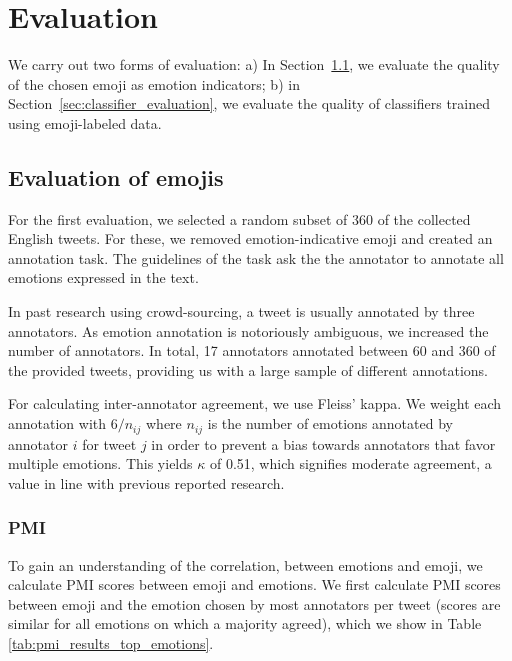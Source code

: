 \documentclass[10pt, a4paper]{article}
\begin{document}
\section{Evaluation}
\label{sec:evaluation}
We carry out two forms of evaluation: a) In Section~\ref{sec:emoji_evaluation}, we evaluate the quality of the chosen emoji as emotion indicators; b) in Section~\ref{sec:classifier_evaluation}, we evaluate the quality of classifiers trained using emoji-labeled data.

\subsection{Evaluation of emojis}
\label{sec:emoji_evaluation}

For the first evaluation, we selected a random subset of 360 of the collected English tweets. For these, we removed emotion-indicative emoji and created an annotation task. The guidelines of the task ask the the annotator to annotate all emotions expressed in the text.

In past research using crowd-sourcing, a tweet is usually annotated by three annotators. As emotion annotation is notoriously ambiguous, we increased the number of annotators. In total, 17 annotators annotated between 60 and 360 of the provided tweets, providing us with a large sample of different annotations.

For calculating inter-annotator agreement, we use Fleiss' kappa. %
We weight each annotation with $ 6 / n_{ij}$ where $n_{ij}$ is the number of emotions annotated by annotator $i$ for tweet $j$ in order to prevent a bias towards annotators that favor multiple emotions. This yields $\kappa$ of 0.51, which signifies moderate agreement, a value in line with previous reported research.

\subsubsection{PMI}

To gain an understanding of the correlation, between emotions and emoji, we calculate PMI scores between emoji and emotions. We first calculate PMI scores between emoji and the emotion chosen by most annotators per tweet (scores are similar for all emotions on which a majority agreed), which we show in Table \ref{tab:pmi_results_top_emotions}.
\end{document}
